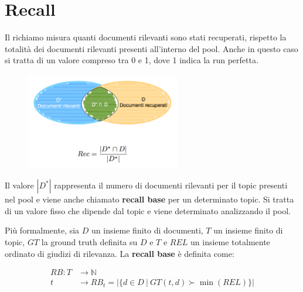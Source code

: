 
\FloatBarrier
\section{Recall}

Il richiamo misura quanti documenti rilevanti sono stati recuperati, rispetto la totalità dei documenti rilevanti presenti all'interno del pool. Anche in questo caso si tratta di un valore compreso tra 0 e 1, dove 1 indica la run perfetta.

\begin{figure}[htbp]
	\centering
	\includegraphics[width=0.6\textwidth]{images/l15-fig-1.png}
\end{figure}

Il valore $|D^*|$ rappresenta il numero di documenti rilevanti per il topic presenti nel pool e viene anche chiamato \textbf{recall base} per un determinato topic. Si tratta di un valore fisso che dipende dal topic e viene determinato analizzando il pool.

Più formalmente, sia $D$ un insieme finito di documenti, $T$ un insieme finito di topic, $GT$ la ground truth definita su $D$ e $T$ e $REL$ un insieme totalmente ordinato di giudizi di rilevanza. La \textbf{recall base} è definita come:

\begin{align*}
	RB : T &\to \mathbb{N} \\
		t &\to RB_t = \Big| \big\{ d \in D \ | \ GT(t,d) \succ \min(REL) \big\} \Big|
\end{align*}

